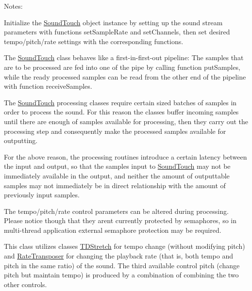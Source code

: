 Notes\+:
\begin{DoxyItemize}
\item Initialize the \hyperlink{classsoundtouch_1_1_sound_touch}{Sound\+Touch} object instance by setting up the sound stream parameters with functions \textquotesingle{}set\+Sample\+Rate\textquotesingle{} and \textquotesingle{}set\+Channels\textquotesingle{}, then set desired tempo/pitch/rate settings with the corresponding functions.
\item The \hyperlink{classsoundtouch_1_1_sound_touch}{Sound\+Touch} class behaves like a first-\/in-\/first-\/out pipeline\+: The samples that are to be processed are fed into one of the pipe by calling function \textquotesingle{}put\+Samples\textquotesingle{}, while the ready processed samples can be read from the other end of the pipeline with function \textquotesingle{}receive\+Samples\textquotesingle{}.
\item The \hyperlink{classsoundtouch_1_1_sound_touch}{Sound\+Touch} processing classes require certain sized \textquotesingle{}batches\textquotesingle{} of samples in order to process the sound. For this reason the classes buffer incoming samples until there are enough of samples available for processing, then they carry out the processing step and consequently make the processed samples available for outputting.
\item For the above reason, the processing routines introduce a certain \textquotesingle{}latency\textquotesingle{} between the input and output, so that the samples input to \hyperlink{classsoundtouch_1_1_sound_touch}{Sound\+Touch} may not be immediately available in the output, and neither the amount of outputtable samples may not immediately be in direct relationship with the amount of previously input samples.
\item The tempo/pitch/rate control parameters can be altered during processing. Please notice though that they aren\textquotesingle{}t currently protected by semaphores, so in multi-\/thread application external semaphore protection may be required.
\item This class utilizes classes \textquotesingle{}\hyperlink{classsoundtouch_1_1_t_d_stretch}{T\+D\+Stretch}\textquotesingle{} for tempo change (without modifying pitch) and \textquotesingle{}\hyperlink{classsoundtouch_1_1_rate_transposer}{Rate\+Transposer}\textquotesingle{} for changing the playback rate (that is, both tempo and pitch in the same ratio) of the sound. The third available control \textquotesingle{}pitch\textquotesingle{} (change pitch but maintain tempo) is produced by a combination of combining the two other controls.
\end{DoxyItemize}

